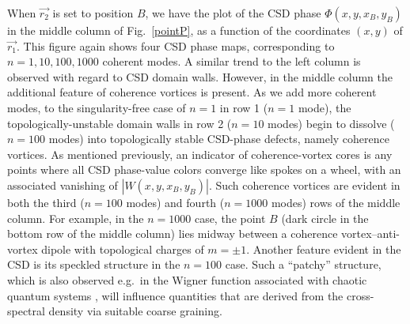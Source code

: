 \documentclass[%
 reprint,
 amsmath,amssymb,
 aps,
]{revtex4-1}
\begin{document}
When $\vec{r_2}$ is set to position $B$, we have the plot of the CSD phase $\Phi(x,y,x_B,y_B)$ in the middle column of Fig.~\ref{pointP}, as a function of the coordinates $(x,y)$ of $\vec{r_1}$.  This figure again shows four CSD phase maps, corresponding to $n=1,10,100,1000$ coherent modes.  A similar trend to the left column is observed with regard to CSD domain walls.  However, in the middle column the additional feature of coherence vortices is present.  As we add more coherent modes, to the singularity-free case of $n=1$ in row 1 ($n=1$ mode), the topologically-unstable domain walls in row 2 ($n=10$ modes) begin to dissolve ($n=100$ modes) into  topologically stable CSD-phase defects, namely coherence vortices. As mentioned previously, an indicator of coherence-vortex cores is any points where all CSD phase-value colors converge like spokes on a wheel, with an associated vanishing of $|W(x,y,x_B,y_B)|$.  Such coherence vortices are evident in both the third ($n=100$ modes) and fourth ($n=1000$ modes) rows of the middle column.  For example, in the $n=1000$ case, the point $B$ (dark circle in the bottom row of the middle column) lies midway between a coherence vortex--anti-vortex dipole with topological charges of $m = \pm 1$. Another feature evident in the CSD is its speckled  structure in the $n=100$ case.  Such a ``patchy'' structure, which is also observed e.g.~in the Wigner function associated with chaotic quantum systems \cite{Zurek}, will influence quantities that are derived from the cross-spectral density via suitable coarse graining.
\end{document}
